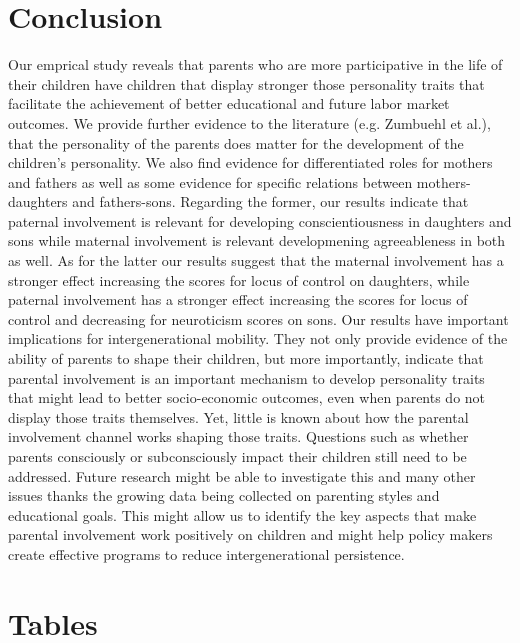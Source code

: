 \documentclass[%
    a4paper,            %
    11pt,               %
    bibliography=totoc, %
]
{scrartcl}
\begin{document}
\section{Conclusion}
Our emprical study reveals that parents who are more participative in the life of their children have children that display stronger those personality traits that facilitate the achievement of better educational and future labor market outcomes. We provide further evidence to the literature (e.g. Zumbuehl et al.), that the personality of the parents does matter for the development of the children's personality. We also find evidence for differentiated roles for mothers and fathers as well as some evidence for specific relations between mothers-daughters and fathers-sons. Regarding the former, our results indicate that paternal involvement is relevant for developing conscientiousness in daughters and sons while maternal involvement is relevant developmening agreeableness in both as well. As for the latter our results suggest that the maternal involvement has a stronger effect increasing the scores for locus of control on daughters, while paternal involvement has a stronger effect increasing the scores for locus of control and decreasing for neuroticism scores on sons. \newline
Our results have important implications for intergenerational mobility. They not only provide evidence of the ability of parents to shape their children, but more importantly, indicate that parental involvement is an important mechanism to develop personality traits that might lead to better socio-economic outcomes, even when parents do not display those traits themselves. \newline 
Yet, little is known about how the parental involvement channel works shaping those traits. Questions such as whether parents consciously or subconsciously impact their children still need to be addressed. Future research might be able to investigate this and many other issues thanks the growing data being collected on parenting styles and educational goals. This might allow us to identify the key aspects that make parental involvement work positively on children and might help policy makers create effective programs to reduce intergenerational persistence.







\pagebreak
\section{Tables
}
\end{document}

